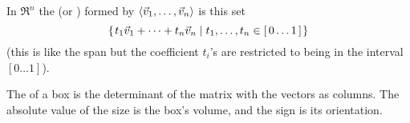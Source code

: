\documentclass[answers, nolegalese, 11pt]{examjh}
\begin{document}
\thispagestyle{empty}
\vspace{-1ex}
\makebox[\textwidth]{\hbox{}\hrulefill\hbox{}}

In $\Re^n$
the 
(or )
formed by 
\( \langle\vec{v}_1,\dots,\vec{v}_n\rangle \) 
is this set
\begin{equation*}
  \mbox{$\{\hspace{0.1em}t_1\vec{v}_1+\dots+t_n\vec{v}_n
      \mid t_1,\ldots,t_n\in [\,0\ldots 1\,]\hspace{0.1em}\}$} 
\end{equation*}
(this is like the span but the coefficient $t_i$'s are restricted
to being in the interval $[0\ldots 1]$).

The  of a box is the determinant of the matrix
with the vectors as columns.
The absolute value of the size is the box's volume, and the sign
is its orientation.
\end{document}
